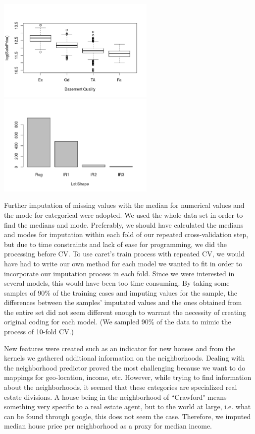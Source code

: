 \documentclass[12pt]{article}
\begin{document}
\begin{center}
\includegraphics[width = 3in]{bsmtqual.png}
\includegraphics[width = 3in]{lotshape.png}
\end{center}

Further imputation of missing values with the median for numerical values and the mode for categorical were adopted.  We used the whole data set in order to find the medians and mode.  Preferably, we should have calculated the medians and modes for imputation within each fold of our repeated cross-validation step, but due to time constraints and lack of ease for programming, we did the processing before CV.  To use caret's train process with repeated CV, we would have had to write our own method for each model we wanted to fit in order to incorporate our imputation process in each fold.  Since we were interested in several models, this would have been too time consuming.  By taking some samples of 90\% of the training cases and imputing values for the sample, the differences between the samples' imputated values and the ones obtained from the entire set did not seem different enough to warrant the necessity of creating original coding for each model.  (We sampled 90\% of the data to mimic the process of 10-fold CV.)

New features were created such as an indicator for new houses and from the kernels we gathered additional information on the neighborhoods.  Dealing with the neighborhood predictor proved the most challenging because we want to do mappings for geo-location, income, etc.  However, while trying to find information about the neighborhoods, it seemed that these categories are specialized real estate divisions.  A house being in the neighborhood of ``Crawford" means something very specific to a real estate agent, but to the world at large, i.e. what can be found through google, this does not seem the case.  Therefore, we imputed median house price per neighborhood as a proxy for median income.
\end{document}
